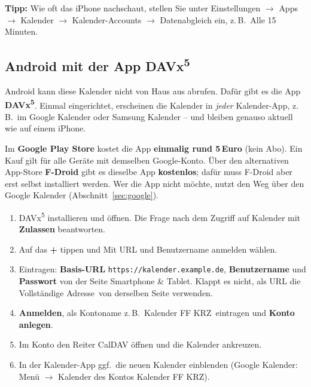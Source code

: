 \documentclass[a4paper,fontsize=10pt]{scrartcl}
\newcommand{\kalenderadresse}{kalender.example.de}   %
\newcommand{\knopf}[1]{\textsf{\textbf{#1}}}
\newcommand{\menue}[1]{\textsf{#1}}
\begin{document}
\textbf{Tipp:} Wie oft das iPhone nachschaut, stellen Sie unter
\menue{Einstellungen} $\rightarrow$ \menue{Apps} $\rightarrow$
\menue{Kalender} $\rightarrow$ \menue{Kalender-Accounts} $\rightarrow$
\menue{Datenabgleich} ein, z.\,B.\ \glqq Alle 15 Minuten\grqq.

\subsection{Android mit der App DAVx\textsuperscript{5}}

Android kann diese Kalender nicht von Haus aus abrufen. Dafür gibt es die App
\textbf{DAVx\textsuperscript{5}}. Einmal eingerichtet, erscheinen die
Kalender in \emph{jeder} Kalender-App, z.\,B.\ im Google Kalender oder Samsung
Kalender -- und bleiben genauso aktuell wie auf einem iPhone.

\begin{dshinweis}[title={Was kostet DAVx\textsuperscript{5}?}]
Im \textbf{Google Play Store} kostet die App \textbf{einmalig rund 5\,Euro}
(kein Abo). Ein Kauf gilt für alle Geräte mit demselben Google-Konto. Über den
alternativen App-Store \textbf{F-Droid} gibt es dieselbe App
\textbf{kostenlos}; dafür muss F-Droid aber erst selbst installiert werden.
Wer die App nicht möchte, nutzt den Weg über den Google Kalender
(Abschnitt~\ref{sec:google}).
\end{dshinweis}

\begin{enumerate}
  \item DAVx\textsuperscript{5} installieren und öffnen. Die Frage nach dem
        Zugriff auf Kalender mit \knopf{Zulassen} beantworten.
  \item Auf das \knopf{+} tippen und \menue{Mit URL und Benutzername
        anmelden} wählen.
  \item Eintragen: \textbf{Basis-URL} \texttt{https://\kalenderadresse},
        \textbf{Benutzername} und \textbf{Passwort} von der Seite
        \menue{Smartphone \& Tablet}. Klappt es nicht, als URL die
        \glqq Vollständige Adresse\grqq\ von derselben Seite verwenden.
  \item \knopf{Anmelden}, als Kontoname z.\,B.\ \glqq Kalender FF KRZ\grqq\
        eintragen und \knopf{Konto anlegen}.
  \item Im Konto den Reiter \menue{CalDAV} öffnen und die Kalender
        ankreuzen.
  \item In der Kalender-App ggf.\ die neuen Kalender einblenden (Google
        Kalender: Menü $\rightarrow$ Kalender des Kontos \glqq Kalender FF
        KRZ\grqq).
\end{enumerate}
\end{document}

